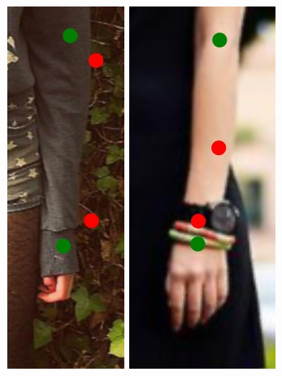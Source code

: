 \begin{figure}[!t]
    \newcommand{\fh}{0.24\columnwidth}
    \centering
    \includegraphics[height=\fh]{resources/Annotation_Correction/Fixing/fix_1}
    \hfill
    \includegraphics[height=\fh]{resources/Annotation_Correction/Fixing/fix_2}
    \hfill

\end{figure}
